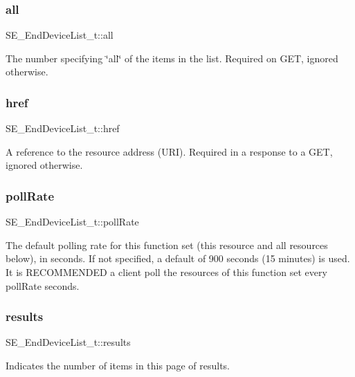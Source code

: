\subsubsection{\texorpdfstring{all}{all}}
{\footnotesize\ttfamily S\+E\+\_\+\+End\+Device\+List\+\_\+t\+::all}

The number specifying \char`\"{}all\char`\"{} of the items in the list. Required on G\+ET, ignored otherwise. \mbox{\label{group__EndDeviceList_ga2dee4395bae5adb1b32a956a23a94d05}} 
\subsubsection{\texorpdfstring{href}{href}}
{\footnotesize\ttfamily S\+E\+\_\+\+End\+Device\+List\+\_\+t\+::href}

A reference to the resource address (U\+RI). Required in a response to a G\+ET, ignored otherwise. \mbox{\label{group__EndDeviceList_gaadffae7b67b10a6e379b98a3e43f1c5e}} 
\subsubsection{\texorpdfstring{poll\+Rate}{pollRate}}
{\footnotesize\ttfamily S\+E\+\_\+\+End\+Device\+List\+\_\+t\+::poll\+Rate}

The default polling rate for this function set (this resource and all resources below), in seconds. If not specified, a default of 900 seconds (15 minutes) is used. It is R\+E\+C\+O\+M\+M\+E\+N\+D\+ED a client poll the resources of this function set every poll\+Rate seconds. \mbox{\label{group__EndDeviceList_gabaccd9c1e6895d28cbee5cc2eca2b23e}} 
\subsubsection{\texorpdfstring{results}{results}}
{\footnotesize\ttfamily S\+E\+\_\+\+End\+Device\+List\+\_\+t\+::results}

Indicates the number of items in this page of results. \mbox{\label{group__EndDeviceList_ga2b2e8f1980c958770b758272899979d0}} 
